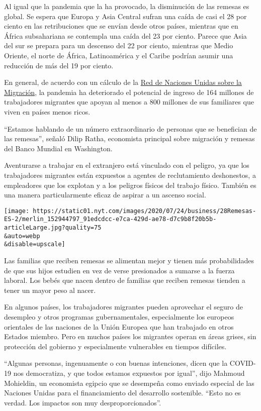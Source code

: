 Al igual que la pandemia que la ha provocado, la disminución de las
remesas es global. Se espera que Europa y Asia Central sufran una caída
de casi el 28 por ciento en las retribuciones que se envían desde otros
países, mientras que en África subsahariana se contempla una caída del
23 por ciento. Parece que Asia del sur se prepara para un descenso del
22 por ciento, mientras que Medio Oriente, el norte de África,
Latinoamérica y el Caribe podrían asumir una reducción de más del 19 por
ciento.

En general, de acuerdo con un cálculo de la
\href{https://migrationnetwork.un.org/sites/default/files/policy_brief-_remittances_in_the_time_of_covid-19.pdf}{Red
de Naciones Unidas sobre la Migración}, la pandemia ha deteriorado el
potencial de ingreso de 164 millones de trabajadores migrantes que
apoyan al menos a 800 millones de sus familiares que viven en países
menos ricos.

``Estamos hablando de un número extraordinario de personas que se
benefician de las remesas'', señaló Dilip Ratha, economista principal
sobre migración y remesas del Banco Mundial en Washington.

Aventurarse a trabajar en el extranjero está vinculado con el peligro,
ya que los trabajadores migrantes están expuestos a agentes de
reclutamiento deshonestos, a empleadores que los explotan y a los
peligros físicos del trabajo físico. También es una manera
particularmente eficaz de aspirar a un ascenso social.

\texttt{[image: https://static01.nyt.com/images/2020/07/24/business/28Remesas-ES-2/merlin\_152944797\_91edcdcc-e7ca-429d-ae78-d7c9b8f20b5b-articleLarge.jpg?quality=75\\\&auto=webp\\\&disable=upscale]}

Las familias que reciben remesas se alimentan mejor y tienen más
probabilidades de que sus hijos estudien en vez de verse presionados a
sumarse a la fuerza laboral. Los bebés que nacen dentro de familias que
reciben remesas tienden a tener un mayor peso al nacer.

En algunos países, los trabajadores migrantes pueden aprovechar el
seguro de desempleo y otros programas gubernamentales, especialmente los
europeos orientales de las naciones de la Unión Europea que han
trabajado en otros Estados miembro. Pero en muchos países los migrantes
operan en áreas grises, sin protección del gobierno y especialmente
vulnerables en tiempos difíciles.

``Algunas personas, ingenuamente o con buenas intenciones, dicen que la
COVID-19 nos democratiza, y que todos estamos expuestos por igual'',
dijo Mahmoud Mohieldin, un economista egipcio que se desempeña como
enviado especial de las Naciones Unidas para el financiamiento del
desarrollo sostenible. ``Esto no es verdad. Los impactos son muy
desproporcionados''.

